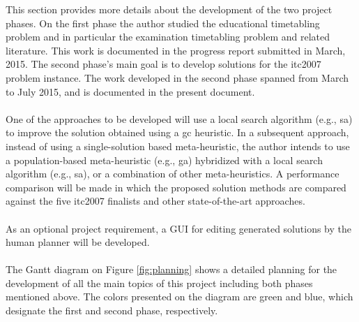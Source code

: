 This section provides more details about the development of the two project phases. On the first phase the author studied the educational timetabling problem and in particular the examination timetabling problem and related literature. This work is documented in the progress report submitted in March, 2015. The second phase's main goal is to develop solutions for the \gls{itc2007} problem instance. The work developed in the second phase spanned from March to July 2015, and is documented in the present document.\\
\\
One of the approaches to be developed will use a local search algorithm (e.g., \gls{sa}) to improve the solution obtained using a \gls{gc} heuristic. In a subsequent approach, instead of using a single-solution based meta-heuristic, the author intends to use a population-based meta-heuristic (e.g., \gls{ga}) hybridized with a local
search algorithm (e.g., \gls{sa}), or a combination of other meta-heuristics. A performance comparison will be made in which the proposed solution methods are compared against the five \gls{itc2007} finalists and other state-of-the-art approaches. \\
\\
As an optional project requirement, a GUI for editing generated solutions by the human planner will be developed.\\
\\
The Gantt diagram on Figure \ref{fig:planning} shows a detailed planning for the development of all the main topics of this project including both phases mentioned above. The colors presented on the diagram are green and blue, which designate the first and second phase, respectively.\\

